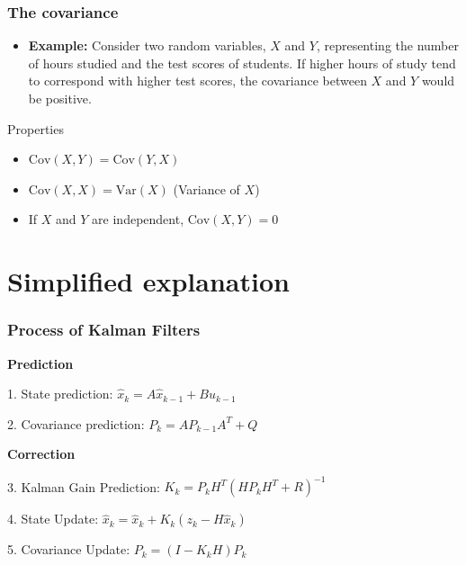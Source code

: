 \documentclass{beamer}
\begin{document}
\begin{frame}
    \frametitle{The covariance}
    \begin{itemize}
        \item \textbf{Example:}
        Consider two random variables, \(X\) and \(Y\), representing the number of hours studied and the test scores of students. If higher hours of study tend to correspond with higher test scores, the covariance between \(X\) and \(Y\) would be positive.
    \end{itemize}

    \begin{block}{Properties}
        \begin{itemize}
            \item \(\text{Cov}(X, Y) = \text{Cov}(Y, X)\)
            \item \(\text{Cov}(X, X) = \text{Var}(X)\) (Variance of \(X\))
            \item If \(X\) and \(Y\) are independent, \(\text{Cov}(X, Y) = 0\)
        \end{itemize}
    \end{block}

\end{frame}

\section{Simplified explanation}

\begin{frame}
    \frametitle{Process of Kalman Filters}

    \textbf{Prediction}

    1. State prediction: \( \hat{x}_{k} = A\hat{x}_{k-1}+Bu_{k-1} \)

    2. Covariance prediction: \( P_{k}=AP_{k-1}A^{T}+Q \)

    \textbf{Correction}

    3. Kalman Gain Prediction: \( K_{k}=P_{k}H^{T}(HP_{k}H^T+R)^{-1} \)

    4. State Update: \( \hat{x}_{k}=\hat{x}_{k}+K_{k}(z_{k}-H\hat{x}_{k}) \)

    5. Covariance Update: \( P_{k}=(I-K_{k}H)P_{k} \)
\end{frame}
\end{document}
